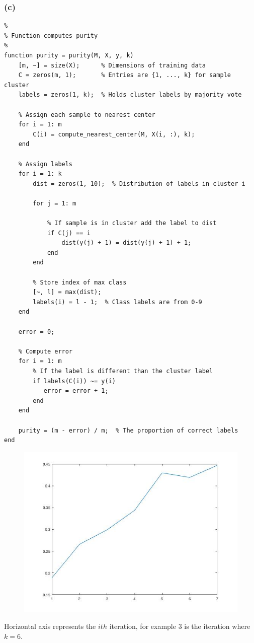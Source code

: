 \documentclass[11pt, oneside]{article}   	%
\begin{document}
\subsubsection{(c)}
\begin{verbatim}
%
% Function computes purity
%
function purity = purity(M, X, y, k)
    [m, ~] = size(X);      % Dimensions of training data
    C = zeros(m, 1);       % Entries are {1, ..., k} for sample cluster
    labels = zeros(1, k);  % Holds cluster labels by majority vote
    
    % Assign each sample to nearest center
    for i = 1: m
        C(i) = compute_nearest_center(M, X(i, :), k);
    end
    
    % Assign labels
    for i = 1: k
        dist = zeros(1, 10);  % Distribution of labels in cluster i
        
        for j = 1: m
            
            % If sample is in cluster add the label to dist
            if C(j) == i
                dist(y(j) + 1) = dist(y(j) + 1) + 1;
            end
        end
        
        % Store index of max class
        [~, l] = max(dist);
        labels(i) = l - 1;  % Class labels are from 0-9
    end
    
    error = 0;
    
    % Compute error
    for i = 1: m
        % If the label is different than the cluster label
        if labels(C(i)) ~= y(i)
           error = error + 1; 
        end
    end
    
    purity = (m - error) / m;  % The proportion of correct labels
end
\end{verbatim}
\begin{figure}[h!]
\includegraphics[width=\textwidth]{purity.jpg}
\end{figure}
Horizontal axis represents the $ith$ iteration, for example $3$ is the iteration where $k = 6$.
\newpage{}
\end{document}
